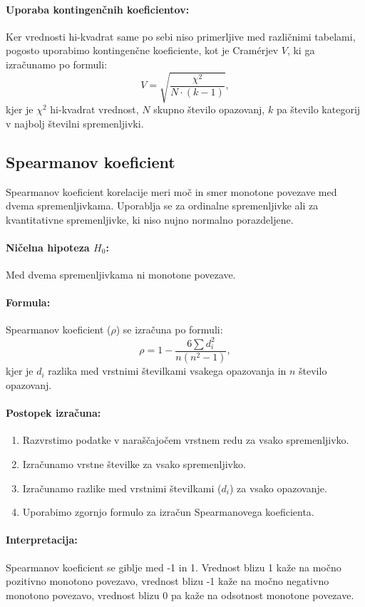 \paragraph{Uporaba kontingenčnih koeficientov:}
Ker vrednosti hi-kvadrat same po sebi niso primerljive med različnimi tabelami, pogosto uporabimo kontingenčne koeficiente, kot je Cramérjev $V$, ki ga izračunamo po formuli:
\[V = \sqrt{\frac{\chi^2}{N \cdot (k - 1)}},\]
kjer je $\chi^2$ hi-kvadrat vrednost, $N$ skupno število opazovanj, $k$ pa število kategorij v najbolj številni spremenljivki.

\subsection{Spearmanov koeficient}

Spearmanov koeficient korelacije meri moč in smer monotone povezave med dvema spremenljivkama. Uporablja se za ordinalne spremenljivke ali za kvantitativne spremenljivke, ki niso nujno normalno porazdeljene.

\paragraph{Ničelna hipoteza $H_0$:}
Med dvema spremenljivkama ni monotone povezave.

\paragraph{Formula:}
Spearmanov koeficient ($\rho$) se izračuna po formuli:
\[\rho = 1 - \frac{6 \sum d_i^2}{n(n^2 - 1)},\]
kjer je $d_i$ razlika med vrstnimi številkami vsakega opazovanja in $n$ število opazovanj.

\paragraph{Postopek izračuna:}
\begin{enumerate}
    \item Razvrstimo podatke v naraščajočem vrstnem redu za vsako spremenljivko.
    \item Izračunamo vrstne številke za vsako spremenljivko.
    \item Izračunamo razlike med vrstnimi številkami ($d_i$) za vsako opazovanje.
    \item Uporabimo zgornjo formulo za izračun Spearmanovega koeficienta.
\end{enumerate}

\paragraph{Interpretacija:}
Spearmanov koeficient se giblje med -1 in 1. Vrednost blizu 1 kaže na močno pozitivno monotono povezavo, vrednost blizu -1 kaže na močno negativno monotono povezavo, vrednost blizu 0 pa kaže na odsotnost monotone povezave.

